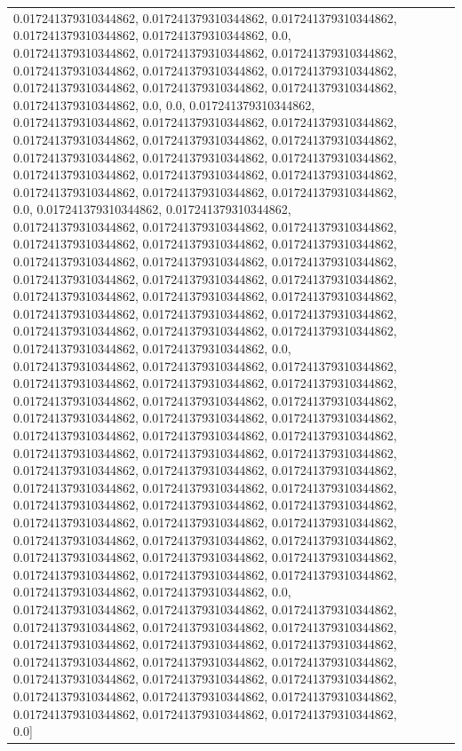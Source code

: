 \begin{tabular}{llll}
0.017241379310344862, 0.017241379310344862, 0.017241379310344862, 0.017241379310344862, 0.017241379310344862, 0.0, 0.017241379310344862, 0.017241379310344862, 0.017241379310344862, 0.017241379310344862, 0.017241379310344862, 0.017241379310344862, 0.017241379310344862, 0.017241379310344862, 0.017241379310344862, 0.017241379310344862, 0.0, 0.0, 0.017241379310344862, 0.017241379310344862, 0.017241379310344862, 0.017241379310344862, 0.017241379310344862, 0.017241379310344862, 0.017241379310344862, 0.017241379310344862, 0.017241379310344862, 0.017241379310344862, 0.017241379310344862, 0.017241379310344862, 0.017241379310344862, 0.017241379310344862, 0.017241379310344862, 0.017241379310344862, 0.0, 0.017241379310344862, 0.017241379310344862, 0.017241379310344862, 0.017241379310344862, 0.017241379310344862, 0.017241379310344862, 0.017241379310344862, 0.017241379310344862, 0.017241379310344862, 0.017241379310344862, 0.017241379310344862, 0.017241379310344862, 0.017241379310344862, 0.017241379310344862, 0.017241379310344862, 0.017241379310344862, 0.017241379310344862, 0.017241379310344862, 0.017241379310344862, 0.017241379310344862, 0.017241379310344862, 0.017241379310344862, 0.017241379310344862, 0.017241379310344862, 0.017241379310344862, 0.0, 0.017241379310344862, 0.017241379310344862, 0.017241379310344862, 0.017241379310344862, 0.017241379310344862, 0.017241379310344862, 0.017241379310344862, 0.017241379310344862, 0.017241379310344862, 0.017241379310344862, 0.017241379310344862, 0.017241379310344862, 0.017241379310344862, 0.017241379310344862, 0.017241379310344862, 0.017241379310344862, 0.017241379310344862, 0.017241379310344862, 0.017241379310344862, 0.017241379310344862, 0.017241379310344862, 0.017241379310344862, 0.017241379310344862, 0.017241379310344862, 0.017241379310344862, 0.017241379310344862, 0.017241379310344862, 0.017241379310344862, 0.017241379310344862, 0.017241379310344862, 0.017241379310344862, 0.017241379310344862, 0.017241379310344862, 0.017241379310344862, 0.017241379310344862, 0.017241379310344862, 0.017241379310344862, 0.017241379310344862, 0.017241379310344862, 0.017241379310344862, 0.017241379310344862, 0.0, 0.017241379310344862, 0.017241379310344862, 0.017241379310344862, 0.017241379310344862, 0.017241379310344862, 0.017241379310344862, 0.017241379310344862, 0.017241379310344862, 0.017241379310344862, 0.017241379310344862, 0.017241379310344862, 0.017241379310344862, 0.017241379310344862, 0.017241379310344862, 0.017241379310344862, 0.017241379310344862, 0.017241379310344862, 0.017241379310344862, 0.017241379310344862, 0.017241379310344862, 0.017241379310344862, 0.0] \\

\end{tabular}
